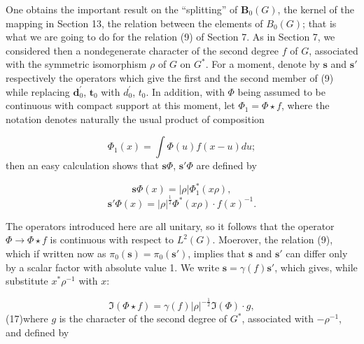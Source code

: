 \documentclass[12pt]{amsart}
\newcounter{ssection}
\renewcommand{\subsection}{
  \addtocounter{ssection}{1}{\bf  \arabic{ssection}.\  }}
\begin{document}
\subsection{}
One obtains the important result on the {}``splitting'' of $\mathbf{B}_{0}(G)$,
the kernel of the mapping in Section 13, the relation between the
elements of $B_{0}(G)$; that is what we are going to do for the relation
(9) of Section 7. As in Section 7, we considered then a nondegenerate
character of the second degree $f$ of $G$, associated with the symmetric
isomorphism $\rho$ of $G$ on $G^{*}$. For a moment, denote by $\mathbf{s}$
and $\mathbf{s}'$ respectively the operators which give the first
and the second member of (9) while replacing $\mathbf{d}_{0}^{'}$,
$\mathbf{t}_{0}$ with $d_{0}^{'}$, $t_{0}$. In addition, with $\Phi$
being assumed to be continuous with compact support at this moment,
let $\Phi_{1}=\Phi\star f$, where the notation denotes naturally
the usual product of composition

\[
\Phi_{1}(x)=\int\Phi(u)f(x-u)du;\]
 then an easy calculation shows that $\mathbf{s}\Phi$, $\mathbf{s}'\Phi$
are defined by

\[
\mathbf{s}\Phi(x)=|\rho|\Phi_{1}^{*}(x\rho),\]
 \[
\mathbf{s}'\Phi(x)=|\rho|^{\frac{1}{2}}\Phi^{*}(x\rho)\cdot f(x)^{-1}.\]


The operators introduced here are all unitary, so it follows that
the operator $\Phi\rightarrow\Phi\star f$ is continuous with respect
to $L^{2}(G)$. Moerover, the relation (9), which if written now as
$\pi_{0}(\mathbf{s})=\pi_{0}(\mathbf{s}')$, implies that $\mathbf{s}$
and $\mathbf{s}'$ can differ only by a scalar factor with absolute
value 1. We write $\mathbf{s}=\gamma(f)\mathbf{s}'$, which gives,
while substitute $x^{*}\rho^{-1}$ with $x$:

\[
\mathfrak{I}(\Phi\star f)=\gamma(f)|\rho|^{-\frac{1}{2}}\mathfrak{I}(\Phi)\cdot g,\]
 (17)where $g$ is the character of the second degree of $G^{*}$,
associated with $-\rho^{-1}$, and defined by
\end{document}
